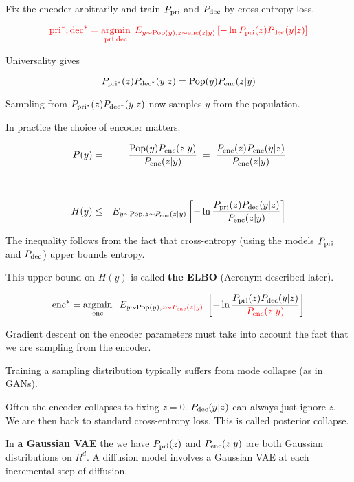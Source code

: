 {
Fix the encoder arbitrarily and train $P_{\mathrm{pri}}$ and $P_{\mathrm{dec}}$ by cross entropy loss.

$${\color{red}\mathrm{pri}^*,\mathrm{dec}^* = \operatorname*{argmin}_{\mathrm{pri},\mathrm{dec}}\;E_{y \sim \mathrm{Pop}(y),z \sim \mathrm{enc}(z|y)}\left[-\ln P_{\mathrm{pri}}(z)P_{\mathrm{dec}}(y|z)\right]}$$

\vfill
Universality gives

{\color{red} $$P_{\mathrm{pri}^*}(z)P_{\mathrm{dec}^*}(y|z) = \mathrm{Pop}(y)P_{\mathrm{enc}}(z|y)$$}

\vfill
Sampling from $P_{\mathrm{pri}^*}(z)P_{\mathrm{dec}^*}(y|z)$ now samples $y$ from the population.


In practice the choice of encoder matters.

\begin{eqnarray*}
P(y) & = & \frac{\mathrm{Pop}(y)P_{\mathrm{enc}}(z|y)}{P_{\mathrm{enc}}(z|y)} \;=\; \frac{P_{\mathrm{enc}}(z)P_{\mathrm{enc}}(y|z)}{P_{\mathrm{enc}}(z|y)} \\ \\
\\
H(y) & \leq & E_{y \sim \mathrm{Pop},z \sim P_{\mathrm{enc}}(z|y)}\left[ - \ln \frac{P_{\mathrm{pri}}(z)P_{\mathrm{dec}}(y|z)}{P_{\mathrm{enc}}(z|y)}\right]
\end{eqnarray*}

\vfill
The inequality follows from the fact that cross-entropy (using the models $P_{\mathrm{pri}}$ and $P_{\mathrm{dec}}$) upper bounds entropy.

\vfill
This upper bound on $H(y)$ is called {\bf the ELBO} (Acronym described later).



$$\mathrm{enc}^* = \operatorname*{argmin}_{\mathrm{enc}}\;\;E_{y\sim \mathrm{Pop}(y),{\color{red} z\sim P_{\mathrm{enc}}(z|y)}}\;\left[- \ln \frac{P_{\mathrm{pri}}(z)P_{\mathrm{dec}}(y|z)}{{\color{red} P_{\mathrm{enc}}(z|y)}}\right]$$

\vfill
Gradient descent on the encoder parameters must take into account the fact that we are sampling from the encoder.

\vfill
Training a sampling distribution typically suffers from mode collapse (as in GANs).

\vfill
Often the encoder collapses to fixing $z = 0$. $P_{\mathrm{dec}}(y|z)$ can always just ignore $z$. We are then back to standard cross-entropy loss.
This is called posterior collapse.


In {\bf a Gaussian VAE} the we have $P_{\mathrm{pri}}(z)$ and $P_{\mathrm{enc}}(z|y)$ are both Gaussian distributions on $R^d$.
A diffusion model involves a Gaussian VAE at each incremental step of diffusion.

}
